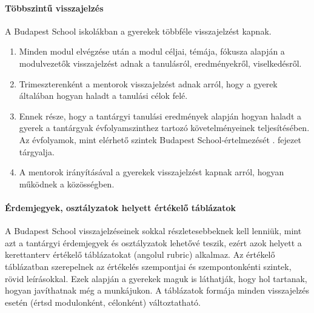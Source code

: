 \paragraph{Többszintű visszajelzés} A Budapest School iskolákban a gyerekek
többféle visszajelzést kapnak. \begin{enumerate}
      \item Minden modul elvégzése után a modul céljai, témája, fókusza alapján
            a
            modulvezetők visszajelzést adnak a tanulásról, eredményekről,
            viselkedésről.
      \item Trimeszterenként a mentorok visszajelzést adnak arról, hogy a
            gyerek
            általában hogyan haladt a tanulási célok felé.
      \item Ennek része, hogy a tantárgyi tanulási eredmények alapján hogyan
            haladt a
            gyerek a tantárgyak évfolyamszinthez tartozó követelményeinek
            teljesítésében. Az
            évfolyamok, mint elérhető szintek Budapest School-értelmezését
            . fejezet tárgyalja.
      \item A mentorok irányításával a gyerekek visszajelzést kapnak arról,
            hogyan
            működnek a közösségben.
\end{enumerate}

\paragraph{Érdemjegyek, osztályzatok helyett értékelő táblázatok} A Budapest
School visszajelzéseinek sokkal részletesebbeknek kell lenniük, mint azt a
tantárgyi érdemjegyek és osztályzatok lehetővé teszik, ezért azok helyett a
kerettanterv
értékelő táblázatokat (angolul rubric) alkalmaz. Az értékelő táblázatban
szerepelnek az értékelés szempontjai és szempontonkénti szintek, rövid
leírásokkal.
Ezek alapján a gyerekek maguk is láthatják, hogy hol tartanak, hogyan
javíthatnak még a munkájukon. A táblázatok formája minden visszajelzés esetén
(értsd modulonként, célonként)
változtatható.